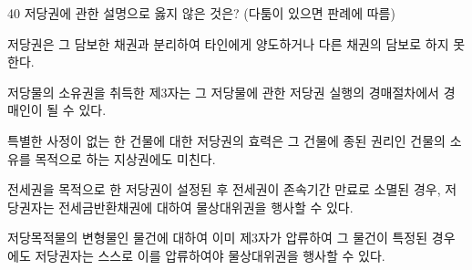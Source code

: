 \begin{question}{40}
저당권에 관한 설명으로 옳지 않은 것은? (다툼이 있으면 판례에 따름)
\begin{choices}
  \item 저당권은 그 담보한 채권과 분리하여 타인에게 양도하거나 다른 채권의 담보로 하지 못한다.
  \item 저당물의 소유권을 취득한 제3자는 그 저당물에 관한 저당권 실행의 경매절차에서 경매인이 될 수 있다.
  \item 특별한 사정이 없는 한 건물에 대한 저당권의 효력은 그 건물에 종된 권리인 건물의 소유를 목적으로 하는 지상권에도 미친다.
  \item 전세권을 목적으로 한 저당권이 설정된 후 전세권이 존속기간 만료로 소멸된 경우, 저당권자는 전세금반환채권에 대하여 물상대위권을 행사할 수 있다.
  \item 저당목적물의 변형물인 물건에 대하여 이미 제3자가 압류하여 그 물건이 특정된 경우에도 저당권자는 스스로 이를 압류하여야 물상대위권을 행사할 수 있다.
\end{choices}
\end{question}
